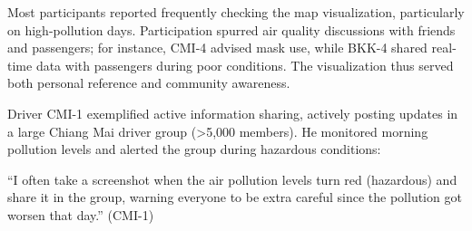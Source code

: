 











Most participants reported frequently checking the map visualization, particularly on high-pollution days.
Participation spurred air quality discussions with friends and passengers; for instance, CMI-4 advised mask use, while BKK-4 shared real-time data with passengers during poor conditions.
The visualization thus served both personal reference and community awareness.


Driver CMI-1 exemplified active information sharing, actively posting updates in a large Chiang Mai \grab{} driver group (>5,000 members).
He monitored morning pollution levels and alerted the group during hazardous conditions:

\begin{quoteb}
 ``I often take a screenshot when the air pollution levels turn red (hazardous) and share it in the group, warning everyone to be extra careful since the pollution got worsen that day.'' (CMI-1)
\end{quoteb}  


